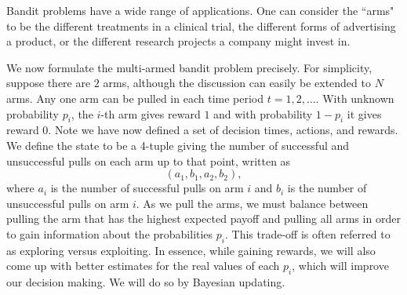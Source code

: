 Bandit problems have a wide range of applications.
One can consider the ``arms" to be the different treatments in a
clinical trial, the different forms of advertising a product,
or the different research projects a company might invest in.

We now formulate the multi-armed bandit problem precisely.
For simplicity, suppose there are $2$ arms, although the
discussion can easily be extended to $N$ arms.
Any one arm can be pulled in each time period $t= 1,2,\ldots$.
With unknown probability $p_i$, the $i$-th arm gives
reward $1$ and with probability $1-p_i$ it gives reward $0$.
Note we have now defined a set of decision times, actions, and rewards.
We define the state to be a 4-tuple giving the number of successful and unsuccessful
pulls on each arm up to that point, written as
\begin{equation}\label{state}
(a_1,b_1,a_2,b_2),
\end{equation}
where $a_i$ is the number of successful pulls on arm $i$ and $b_i$
is the number of unsuccessful pulls on arm $i$.
As we pull the arms, we must balance between pulling the arm that has
the highest expected payoff and pulling all arms in order to gain
information about the probabilities $p_i$.
This trade-off is often referred to as exploring versus exploiting.
In essence, while gaining rewards, we will also come up with
better estimates for the real values of each $p_i$, which will improve our decision making.
We will do so by Bayesian updating.

